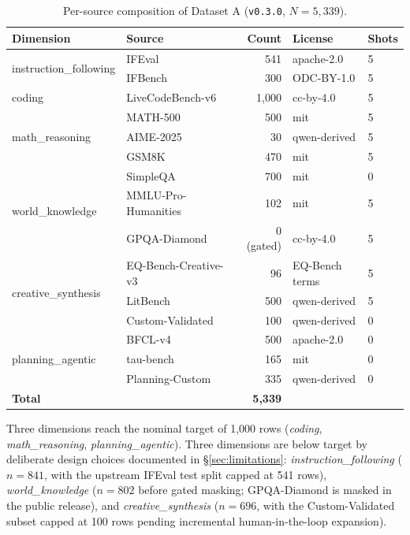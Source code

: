 \documentclass[11pt,a4paper]{article}
\begin{document}
\begin{table}[ht]
\centering
\caption{Per-source composition of Dataset A (\texttt{v0.3.0}, $N{=}5{,}339$).}
\label{tab:composition}
\small
\begin{tabular}{l l r l l}
\toprule
\textbf{Dimension} & \textbf{Source} & \textbf{Count} & \textbf{License} & \textbf{Shots} \\
\midrule
\multirow{2}{*}{instruction\_following}
  & IFEval~\cite{zhou2023ifeval}     & 541 & apache-2.0      & 5 \\
  & IFBench~\cite{pyatkin2025ifbench} & 300 & ODC-BY-1.0      & 5 \\
\midrule
coding
  & LiveCodeBench-v6~\cite{jain2024livecodebench} & 1{,}000 & cc-by-4.0 & 5 \\
\midrule
\multirow{3}{*}{math\_reasoning}
  & MATH-500~\cite{hendrycks2021math} & 500 & mit             & 5 \\
  & AIME-2025                          & 30  & qwen-derived    & 5 \\
  & GSM8K~\cite{cobbe2021gsm8k}        & 470 & mit             & 5 \\
\midrule
\multirow{3}{*}{world\_knowledge}
  & SimpleQA~\cite{wei2024simpleqa}        & 700 & mit             & 0 \\
  & MMLU-Pro-Humanities~\cite{wang2024mmlupro} & 102 & mit         & 5 \\
  & GPQA-Diamond~\cite{rein2024gpqa}        & 0 (gated) & cc-by-4.0  & 5 \\
\midrule
\multirow{3}{*}{creative\_synthesis}
  & EQ-Bench-Creative-v3~\cite{paech2024eqbench} & 96  & EQ-Bench terms & 5 \\
  & LitBench~\cite{stanford2025litbench}         & 500 & qwen-derived   & 5 \\
  & Custom-Validated                              & 100 & qwen-derived   & 0 \\
\midrule
\multirow{3}{*}{planning\_agentic}
  & BFCL-v4~\cite{yan2024bfcl}     & 500 & apache-2.0    & 0 \\
  & tau-bench~\cite{yao2024taubench} & 165 & mit          & 0 \\
  & Planning-Custom                  & 335 & qwen-derived & 0 \\
\midrule
\multicolumn{2}{l}{\textbf{Total}} & \textbf{5{,}339} & & \\
\bottomrule
\end{tabular}
\end{table}

Three dimensions reach the nominal target of 1{,}000 rows (\textit{coding}, \textit{math\_reasoning}, \textit{planning\_agentic}). Three dimensions are below target by deliberate design choices documented in §\ref{sec:limitations}: \textit{instruction\_following} ($n{=}841$, with the upstream IFEval test split capped at 541 rows), \textit{world\_knowledge} ($n{=}802$ before gated masking; GPQA-Diamond is masked in the public release), and \textit{creative\_synthesis} ($n{=}696$, with the Custom-Validated subset capped at 100 rows pending incremental human-in-the-loop expansion).
\end{document}

